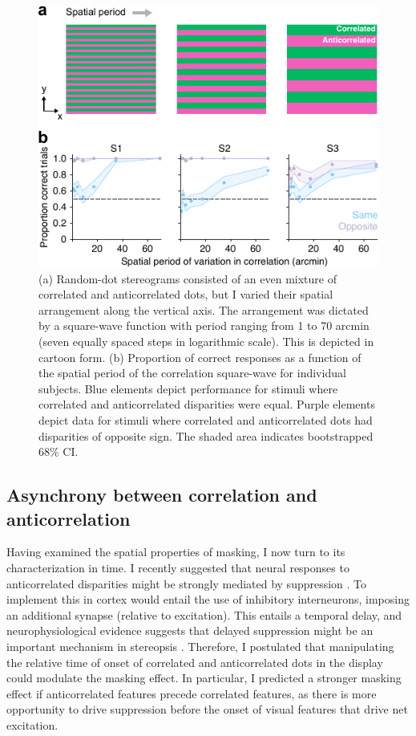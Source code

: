 \begin{figure}
  \centering
  \includegraphics{Fig5}
  \caption[Effect of visuotopic distance between correlated and anticorrelated dots.]{(a) Random-dot stereograms consisted of an even mixture of correlated and anticorrelated dots, but I varied their spatial arrangement along the vertical axis. The arrangement was dictated by a square-wave function with period ranging from 1 to 70 arcmin (seven equally spaced steps in logarithmic scale). This is depicted in cartoon form. (b) Proportion of correct responses as a function of the spatial period of the correlation square-wave for individual subjects. Blue elements depict performance for stimuli where correlated and anticorrelated disparities were equal. Purple elements depict data for stimuli where correlated and anticorrelated dots had disparities of opposite sign. The shaded area indicates bootstrapped 68\% CI.}
  \label{fig:c2f5}
\end{figure}


\subsection{Asynchrony between correlation and anticorrelation}
Having examined the spatial properties of masking, I now turn to its characterization in time. I recently suggested that neural responses to anticorrelated disparities might be strongly mediated by suppression \cite{Goncalves:2017aa}. To implement this in cortex would entail the use of inhibitory interneurons, imposing an additional synapse (relative to excitation). This entails a temporal delay, and neurophysiological evidence suggests that delayed suppression might be an important mechanism in stereopsis \cite{Tanabe:2011pt,Tanabe:2014ud}. Therefore, I postulated that manipulating the relative time of onset of correlated and anticorrelated dots in the display could modulate the masking effect. In particular, I predicted a stronger masking effect if anticorrelated features precede correlated features, as there is more opportunity to drive suppression before the onset of visual features that drive net excitation.

